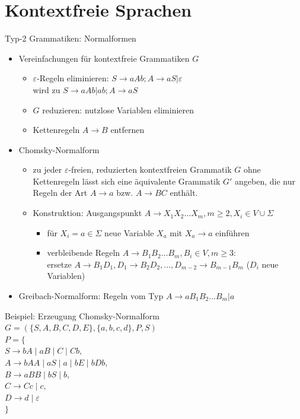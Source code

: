 \section{Kontextfreie Sprachen}

\begin{frame}{Typ-2 Grammatiken: Normalformen}
	\begin{itemize}
		\item Vereinfachungen für kontextfreie Grammatiken $G$
		\begin{itemize}
			\item $\varepsilon$-Regeln eliminieren: $S \rightarrow aAb; A \rightarrow aS|\varepsilon$\\
			wird zu	$S \rightarrow aAb|ab; A \rightarrow aS$
			\item $G$ reduzieren: nutzlose Variablen eliminieren
			\item Kettenregeln $A \rightarrow B$ entfernen
		\end{itemize}
		\item Chomsky-Normalform
		\begin{itemize}
			\item zu jeder $\varepsilon$-freien, reduzierten kontextfreien Grammatik $G$ ohne Kettenregeln lässt sich eine äquivalente Grammatik $G'$ angeben, die nur Regeln der Art $A \rightarrow a$ bzw. $A \rightarrow BC$ enthält.
			\item Konstruktion: Ausgangspunkt $A\rightarrow X_1X_2 \ldots X_m, m\geq 2, X_i \in V \cup \Sigma$
			\begin{itemize}
				\item für $X_i=a\in \Sigma$ neue Variable $X_a$ mit $X_a \rightarrow a$ einführen
				\item verbleibende Regeln $A \rightarrow B_1B_2\ldots B_m, B_i \in V, m\geq 3$:\\
				ersetze $A \rightarrow B_1D_1, D_1\rightarrow B_2D_2, \ldots, D_{m-2}\rightarrow B_{m-1}B_m$ ($D_i$ neue Variablen)
			\end{itemize}
		\end{itemize}
		\item Greibach-Normalform: Regeln vom Typ $A \rightarrow aB_1B_2 \ldots B_m|a$
	\end{itemize}
\end{frame}

\begin{frame}{Beispiel: Erzeugung Chomsky-Normalform}
	$G=(\{S, A, B, C, D, E\}, \{a, b, c, d\}, P, S)$\\
	$P=\{$\\
	\qquad\qquad $S \rightarrow bA \mid aB \mid C \mid Cb,$\\
	\qquad\qquad $A \rightarrow bAA \mid aS \mid a \mid bE \mid bDb,$\\
	\qquad\qquad $B \rightarrow aBB \mid bS \mid b,$\\
	\qquad\qquad $C \rightarrow Cc \mid c,$\\
	\qquad\qquad $D \rightarrow d \mid \varepsilon $\\
	\qquad$\}$
\end{frame}

